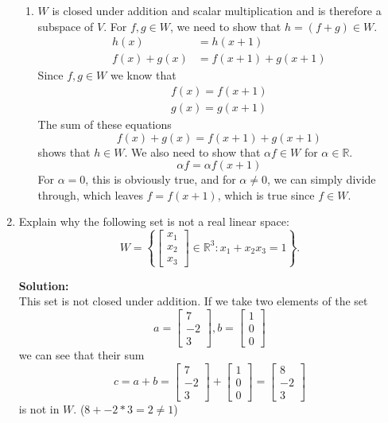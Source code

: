 \documentclass[]{article}
\newcommand{\R}{\mathbb{R}}
\newcommand{\bbm}{\begin{bmatrix}}
\newcommand{\ebm}{\end{bmatrix}}
\newcommand{\x}{\bm{x}}
\newcommand{\solution}{\vskip 0.5cm \textbf{\large Solution:} \\}
\begin{document}
\begin{enumerate}[resume]
\begin{enumerate}
	  \item $W$ is closed under addition and scalar multiplication and
        is therefore a subspace of $V$. For $f,g \in W$, we need to
        show that $h = (f + g) \in W$.
        \[ \begin{split}
          h(x) &= h(x + 1) \\
          f(x) + g(x) &= f(x + 1) + g(x + 1)
        \end{split} \]
        Since $f,g \in W$ we know that
        \begin{gather*}
          f(x) = f(x + 1) \\
          g(x) = g(x + 1)
        \end{gather*}
        The sum of these equations
        \[
        f(x) + g(x) = f(x + 1) + g(x + 1)
        \]        
        shows that $h \in W$.  We also need to show that $\alpha f \in
        W$ for $\alpha \in \R$.
        \[
        \alpha f = \alpha f(x + 1)
        \]
        For $\alpha = 0$, this is obviously true, and for $\alpha \neq
        0$, we can simply divide through, which leaves $f =
        f(x + 1)$, which is true since $f \in W$.
        
        
	  \end{enumerate}

	\item Explain why the following set is not a real linear space:
	  \[
	  W=\left\{\bbm x_1\\x_2\\x_3 \ebm\in\R^3 : x_1+x_2x_3=1\right\}.
	  \]
	  
	  \solution
      This set is not closed under addition. If we take two elements of the set
      \[
      a = \bbm 7 \\ -2 \\ 3 \ebm, b = \bbm 1  \\ 0 \\ 0 \ebm
      \]
      we can see that their sum
      \[
      c = a + b = \bbm 7 \\ -2 \\ 3 \ebm + \bbm 1  \\ 0 \\ 0 \ebm = \bbm 8 \\ -2 \\ 3 \ebm
      \]
      is not in $W$. ($8 + -2*3 = 2 \neq 1$)
    \end{enumerate}
\end{document}
